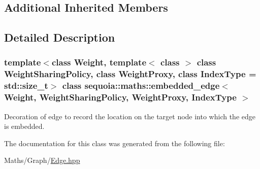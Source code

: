 \subsection*{Additional Inherited Members}


\subsection{Detailed Description}
\subsubsection*{template$<$class Weight, template$<$ class $>$ class Weight\+Sharing\+Policy, class Weight\+Proxy, class Index\+Type = std\+::size\+\_\+t$>$\newline
class sequoia\+::maths\+::embedded\+\_\+edge$<$ Weight, Weight\+Sharing\+Policy, Weight\+Proxy, Index\+Type $>$}

Decoration of edge to record the location on the target node into which the edge is embedded. 

The documentation for this class was generated from the following file\+:\begin{DoxyCompactItemize}
\item 
Maths/\+Graph/\mbox{\hyperlink{_edge_8hpp}{Edge.\+hpp}}\end{DoxyCompactItemize}
